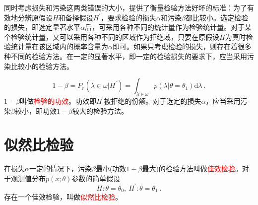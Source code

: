 \documentclass[12pt,a4paper]{article}
\newcommand{\dif}{\mathrm{d}}
\begin{document}
同时考虑损失和污染这两类错误的大小，提供了衡量检验方法好坏的标准：为了有效地分辨原假设$H$和备择假设$H^\prime$，要求检验的损失$\alpha$和污染$\beta$都比较小。选定检验的损失，即选定显著水平$\alpha$后，可采用各种不同的统计量作为检验统计量。对于某个检验统计量，又可以采用各种不同的区域作为拒绝域，只要在原假设$H$为真时检验统计量在该区域内的概率含量为$\alpha$即可。如果只考虑检验的损失，则存在着很多种不同的检验方法。在一定的显著水平，即一定的检验损失的要求下，应当采用污染比较小的检验方法。

\begin{equation}
1-\beta = P_r(\lambda \in \omega |H^\prime) = \int_{\lambda \in \omega} p(\lambda|\theta=\theta_1) \dif \lambda ~.
\end{equation}
$1-\beta$叫做\textcolor{red}{检验的功效}。功效即$H^\prime$被拒绝的份额。对于选定的损失$\alpha$，应当采用污染$\beta$较小，即功效$1-\beta$较大的检验方法。

\section{似然比检验}
在损失$\alpha$一定的情况下，污染$\beta$最小(功效$1-\beta$最大)的检验方法叫做\textcolor{red}{佳效检验}。对于观测值分布$p(x;\theta)$参数的简单假设
\begin{equation}
H: \theta = \theta_0, ~ H^\prime: \theta = \theta_1 ~.
\end{equation}
存在一个佳效检验，叫做\textcolor{red}{似然比检验}。







































































\end{document}
